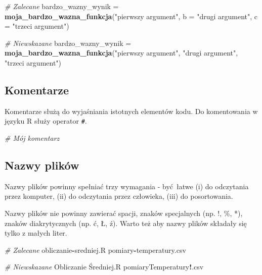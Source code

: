 \documentclass[paper=6in:9in,pagesize=pdftex,headinclude=on,footinclude=on,10pt]{scrbook}
\newenvironment{Shaded}{\begin{snugshade}}{\end{snugshade}}
\newcommand{\CommentTok}[1]{\textcolor[rgb]{0.56,0.35,0.01}{\textit{#1}}}
\newcommand{\DataTypeTok}[1]{\textcolor[rgb]{0.13,0.29,0.53}{#1}}
\newcommand{\KeywordTok}[1]{\textcolor[rgb]{0.13,0.29,0.53}{\textbf{#1}}}
\newcommand{\NormalTok}[1]{#1}
\newcommand{\OperatorTok}[1]{\textcolor[rgb]{0.81,0.36,0.00}{\textbf{#1}}}
\newcommand{\StringTok}[1]{\textcolor[rgb]{0.31,0.60,0.02}{#1}}
\begin{document}
\begin{Shaded}
\begin{Highlighting}[]
\CommentTok{# Zalecane}
\NormalTok{bardzo_wazny_wynik =}\StringTok{ }\KeywordTok{moja_bardzo_wazna_funkcja}\NormalTok{(}\StringTok{"pierwszy argument"}\NormalTok{,}
                                               \DataTypeTok{b =} \StringTok{"drugi argument"}\NormalTok{, }
                                               \DataTypeTok{c =} \StringTok{"trzeci argument"}\NormalTok{)}

\CommentTok{# Niewskazane}
\NormalTok{bardzo_wazny_wynik =}\StringTok{ }\KeywordTok{moja_bardzo_wazna_funkcja}\NormalTok{(}\StringTok{"pierwszy argument"}\NormalTok{, }\StringTok{"drugi argument"}\NormalTok{, }\StringTok{"trzeci argument"}\NormalTok{)}
\end{Highlighting}
\end{Shaded}

\hypertarget{komentarze}{%
\subsection{Komentarze}\label{komentarze}}

Komentarze służą do wyjaśniania istotnych elementów kodu.
Do komentowania w języku R służy operator \texttt{\#}.

\begin{Shaded}
\begin{Highlighting}[]
\CommentTok{# Mój komentarz}
\end{Highlighting}
\end{Shaded}

\hypertarget{nazwy-plikow}{%
\subsection{Nazwy plików}\label{nazwy-plikow}}

Nazwy plików powinny spełniać trzy wymagania - być~łatwe (i) do odczytania przez komputer, (ii) do odczytania przez człowieka, (iii) do posortowania.

Nazwy plików nie powinny zawierać spacji, znaków specjalnych (np. !, \%, *), znaków diakrytycznych (np. ć, Ł, ź).
Warto też aby nazwy plików składały się tylko z małych liter.

\begin{Shaded}
\begin{Highlighting}[]
\CommentTok{# Zalecane}
\NormalTok{obliczanie}\OperatorTok{-}\NormalTok{sredniej.R}
\NormalTok{pomiary}\OperatorTok{-}\NormalTok{temperatury.csv}

\CommentTok{# Niewskazane}
\NormalTok{Obliczanie Średniej.R}
\NormalTok{pomiaryTemperatury}\OperatorTok{!}\NormalTok{.csv}
\end{Highlighting}
\end{Shaded}
\end{document}

